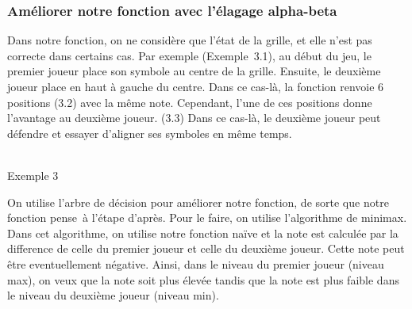 \documentclass[12pt, a4paper]{article}
\begin{document}
\subsubsection{Améliorer notre fonction avec l'élagage alpha-beta}
Dans notre fonction, on ne considère que l'état de la grille, et elle n'est pas correcte dans certains cas. Par exemple \mbox{(Exemple 3.1)}, au début du jeu, le premier joueur place son symbole au centre de la grille. Ensuite, le deuxième joueur place en haut à gauche du centre. Dans ce cas-là, la fonction renvoie 6 positions (3.2) avec la même note. Cependant, l'une de ces positions donne l'avantage au deuxième joueur. (3.3) Dans ce cas-là, le deuxième joueur peut défendre et essayer d'aligner ses symboles en même temps. 
\begin{center}
    \cleargoban
    \cleargoban
    \cleargoban
    \\
    Exemple 3
\end{center}
\par
On utilise l'arbre de décision pour améliorer notre fonction, de sorte que notre fonction \og pense\fg \ à l'étape d'après. Pour le faire, on utilise l'algorithme de minimax. Dans cet algorithme, on utilise notre fonction naïve et la note est calculée par la difference de celle du premier joueur et celle du deuxième joueur. Cette note peut être eventuellement négative. Ainsi, dans le niveau du premier joueur (niveau max), on veux que la note soit plus élevée tandis que la note est plus faible dans le niveau du deuxième joueur (niveau min).

\end{document}
